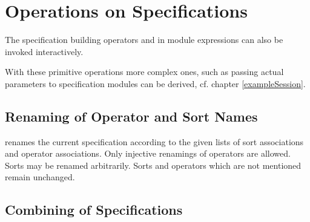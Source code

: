 \section{Operations on Specifications}
\label{OperationsOnSpecifications}

The specification building operators \kw{+} and  in 
module expressions can also be invoked interactively.

With these primitive operations more complex ones, such as passing actual parameters to
specification modules can be derived, cf. chapter \ref{exampleSession}.

\subsection{Renaming of Operator and Sort Names}

\begin{command}
renames the current specification according to the given lists of sort associations
and operator associations. Only injective renamings of operators are allowed.
Sorts may be renamed arbitrarily. Sorts and operators which are not mentioned remain 
unchanged.
\end{command}



\subsection{Combining of Specifications}

